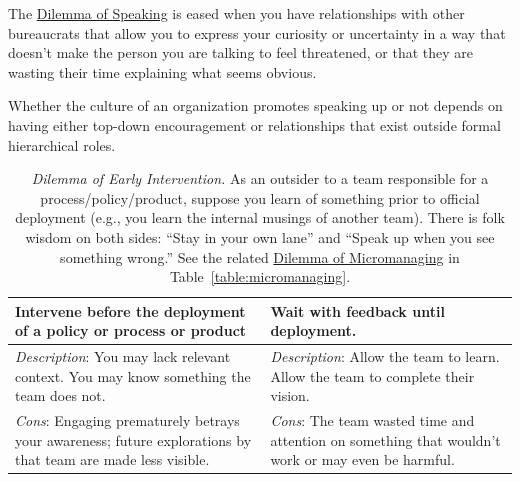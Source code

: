 The \href{table:speak-up-or-hold-back}{Dilemma of Speaking} is eased when you have relationships with other bureaucrats that allow you to express your curiosity or uncertainty in a way that doesn't make the person you are talking to feel threatened, or that they are wasting their time explaining what seems obvious. 

Whether the culture of an organization promotes speaking up or not depends on having either top-down encouragement or relationships that exist outside formal hierarchical roles. 
  
\begin{center}
\begin{table}[H] %
\begin{tabular}{ | m{\dilemmatablewidth}| m{\dilemmatablewidth} | } 
  \hline
  \textbf{Intervene before the deployment of a policy or process or product} &
  \textbf{Wait with feedback until deployment.} \\
  \hline
  \textit{Description}: You may lack relevant context. You may know something the team does not. & 
  \textit{Description}: Allow the team to learn. Allow the team to complete their vision. \\
  \hline
  \textit{Cons}: Engaging prematurely betrays your awareness; future explorations by that team are made less visible. & 
  \textit{Cons}: The team wasted time and attention on something that wouldn't work or may even be harmful. \\
  \hline
\end{tabular}
\caption{
\textit{Dilemma of Early Intervention.}
As an outsider to a team responsible for a process/policy/product, suppose you learn of something prior to official deployment (e.g., you learn the internal musings of another team). There is folk wisdom on both sides: 
``Stay in your own lane'' 
and 
``Speak up when you see something wrong.''
See the related \href{table:micromanaging}{Dilemma of Micromanaging} in Table~\ref{table:micromanaging}.}
\label{table:early-intervention}
\end{table}
\end{center}

